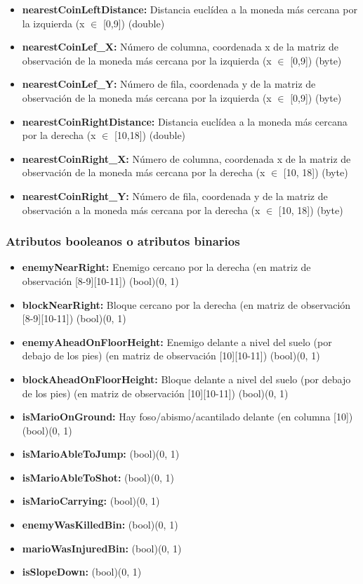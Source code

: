\documentclass[10pt, spanish, pdftex]{../.template/template}
\begin{document}
{\begin{itemize}
        \item \textbf{nearestCoinLeftDistance:} Distancia euclídea a la moneda más cercana por la izquierda (x $\in$ [0,9]) (double)
        \item \textbf{nearestCoinLef\_X:} Número de columna, coordenada x de la matriz de observación de la moneda más cercana por la izquierda (x $\in$ [0,9]) (byte)
        \item \textbf{nearestCoinLef\_Y:} Número de fila, coordenada y de la matriz de observación de la moneda más cercana por la izquierda (x $\in$ [0,9]) (byte)
        \item \textbf{nearestCoinRightDistance:} Distancia euclídea a la moneda más cercana por la derecha (x $\in$ [10,18]) (double)
        \item \textbf{nearestCoinRight\_X:} Número de columna, coordenada x de la matriz de observación de la moneda más cercana por la derecha (x $\in$ [10, 18]) (byte)
        \item \textbf{nearestCoinRight\_Y:} Número de fila, coordenada y de la matriz de observación a la moneda más cercana por la derecha (x $\in$ [10, 18]) (byte)
    \end{itemize}

    \subsubsection{Atributos booleanos o atributos binarios}
    \begin{itemize}
        \item \textbf{enemyNearRight:} Enemigo cercano por la derecha (en matriz de observación [8-9][10-11]) (bool)(0, 1)
        \item \textbf{blockNearRight:} Bloque cercano por la derecha (en matriz de observación [8-9][10-11]) (bool)(0, 1)
        \item \textbf{enemyAheadOnFloorHeight:} Enemigo delante a nivel del suelo (por debajo de los pies) (en matriz de observación [10][10-11]) (bool)(0, 1)
        \item \textbf{blockAheadOnFloorHeight:} Bloque delante a nivel del suelo (por debajo de los pies) (en matriz de observación [10][10-11]) (bool)(0, 1)
        \item \textbf{isMarioOnGround:} Hay foso/abismo/acantilado delante (en columna [10]) (bool)(0, 1)
        \item \textbf{isMarioAbleToJump:} (bool)(0, 1)
        \item \textbf{isMarioAbleToShot:} (bool)(0, 1)
        \item \textbf{isMarioCarrying:} (bool)(0, 1)
        \item \textbf{enemyWasKilledBin:} (bool)(0, 1)
        \item \textbf{marioWasInjuredBin:} (bool)(0, 1)
        \item \textbf{isSlopeDown:} (bool)(0, 1)
    \end{itemize}

}
\end{document}
